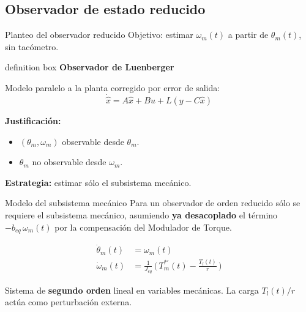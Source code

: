 \documentclass[aspectratio=169,t]{beamer}
\newcommand{\definitionbox}[2]{%
  \begin{beamercolorbox}[wd=\linewidth,sep=0.9ex,leftskip=0.9ex,rightskip=0.9ex]{definition box}%
    {\small\bfseries\color{uncBlue}#1}\par\vspace{0.2mm}%
    {\small #2}%
  \end{beamercolorbox}%
}
\begin{document}
\subsection{Observador de estado reducido}



\begin{frame}{Planteo del observador reducido}
{\small\color{uncGray}Objetivo: estimar $\omega_m(t)$ a partir de $\theta_m(t)$, sin tacómetro.}\par
\vspace{3mm}

\definitionbox{Observador de Luenberger}{
Modelo paralelo a la planta corregido por error de salida:
\[
\dot{\hat{x}}=A\hat{x}+Bu+L(y-C\hat{x})
\]
}

\vspace{3mm}
\textbf{Justificación:}
\begin{itemize}
\item $(\theta_m,\omega_m)$ observable desde $\theta_m$.
\item $\theta_m$ no observable desde $\omega_m$.
\end{itemize}

\vspace{2mm}
\textbf{Estrategia:} estimar sólo el subsistema mecánico.
\end{frame}

\begin{frame}{Modelo del subsistema mecánico}
{\small\color{uncGray}Para un observador de orden reducido sólo se requiere el subsistema mecánico, asumiendo \textbf{ya desacoplado} el término $-b_{eq}\,\omega_m(t)$ por la compensación del Modulador de Torque.}\par
\vspace{8mm}

\begin{align*}
\dot\theta_m(t) &= \omega_m(t) \\[6pt]
\dot \omega_m(t) &= \frac{1}{J_{eq}}\,\Big(\,T_m^{*\prime}(t) - \frac{T_l(t)}{r}\,\Big)
\end{align*}

\vspace{6mm}
{\small Sistema de \textbf{segundo orden} lineal en variables mecánicas. La carga $T_l(t)/r$ actúa como perturbación externa.}
\end{frame}
\end{document}
